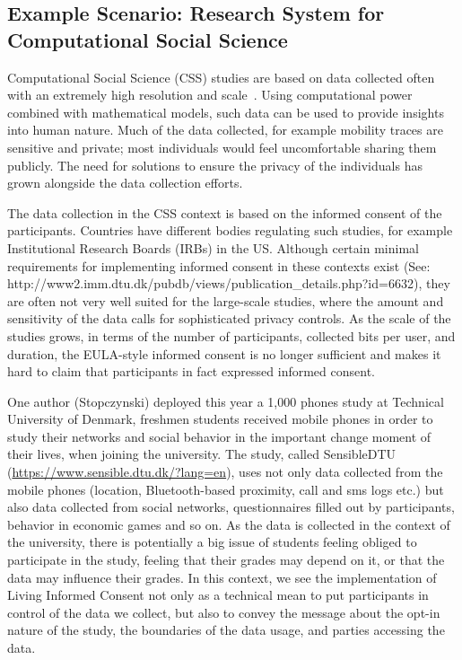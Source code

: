  \subsection{Example Scenario: Research System for Computational Social Science}


Computational Social Science (CSS) studies are based on data collected often with an extremely high resolution and scale~\cite{lazer2009life}.
Using computational power combined with mathematical models, such data can be used to provide insights into human nature.
Much of the data collected, for example mobility traces are sensitive and private; most individuals would feel uncomfortable sharing them publicly.
The need for solutions to ensure the privacy of the individuals has grown alongside the data collection efforts.

The data collection in the CSS context is based on the informed consent of the participants. 
Countries have different bodies regulating such studies, for example Institutional Research Boards (IRBs) in the US. Although certain minimal requirements for implementing informed consent in these contexts exist (See: http://www2.imm.dtu.dk/pubdb/views/publication\_details.php?id=6632), they are often not very well suited for the large-scale studies, where the amount and sensitivity of the data calls for sophisticated privacy controls.
As the scale of the studies grows, in terms of the number of participants, collected bits per user, and duration, the EULA-style informed consent is no longer sufficient and makes it hard to claim that participants in fact expressed informed consent.

One author (Stopczynski) deployed this year a 1,000 phones study at Technical University of Denmark, freshmen students received mobile phones in order to study their networks and social behavior in the important change moment of their lives, when joining the university.
The study, called SensibleDTU (\url{https://www.sensible.dtu.dk/?lang=en}), uses not only data collected from the mobile phones (location, Bluetooth-based proximity, call and sms logs etc.) but also data collected from social networks, questionnaires filled out by participants, behavior in economic games and so on.
As the data is collected in the context of the university, there is potentially a big issue of students feeling obliged to participate in the study, feeling that their grades may depend on it, or that the data may influence their grades.
In this context, we see the implementation of Living Informed Consent not only as a technical mean to put participants in control of the data we collect, but also to convey the message about the opt-in nature of the study, the boundaries of the data usage, and parties accessing the data.

